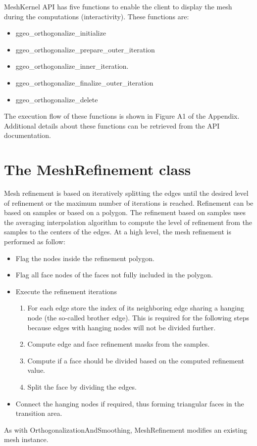 \documentclass[biblatex]{deltares_manual}
\begin{document}
MeshKernel API has five functions to enable the client to display the mesh during the computations (interactivity). These functions are:
\begin{itemize}
\item ggeo\_orthogonalize\_initialize 
\item ggeo\_orthogonalize\_prepare\_outer\_iteration
\item ggeo\_orthogonalize\_inner\_iteration.
\item ggeo\_orthogonalize\_finalize\_outer\_iteration
\item ggeo\_orthogonalize\_delete
\end{itemize}


The execution flow of these functions is shown in Figure A1 of the Appendix. Additional details about these functions can be retrieved from the API documentation.
\chapter{The MeshRefinement class}

Mesh refinement is based on iteratively splitting the edges until the desired level of refinement or the maximum number of iterations is reached. Refinement can be based on samples or based on a polygon. The refinement based on samples uses the averaging interpolation algorithm to compute the level of refinement from the samples to the centers of the edges.
At a high level, the mesh refinement is performed as follow:
\begin{itemize}
\item Flag the nodes inside the refinement polygon.
\item Flag all face nodes of the faces not fully included in the polygon.
\item Execute the refinement iterations
\begin{enumerate}
\item For each edge store the index of its neighboring edge sharing a hanging node (the so-called brother edge). This is required for the following steps because edges with hanging nodes will not be divided further.
\item Compute edge and face refinement masks from the samples.
\item Compute if a face should be divided based on the computed refinement value.
\item Split the face by dividing the edges.
\end{enumerate}
\item Connect the hanging nodes if required, thus forming triangular faces in the transition area.
\end{itemize}
As with OrthogonalizationAndSmoothing, MeshRefinement modifies an existing mesh instance.
\end{document}
